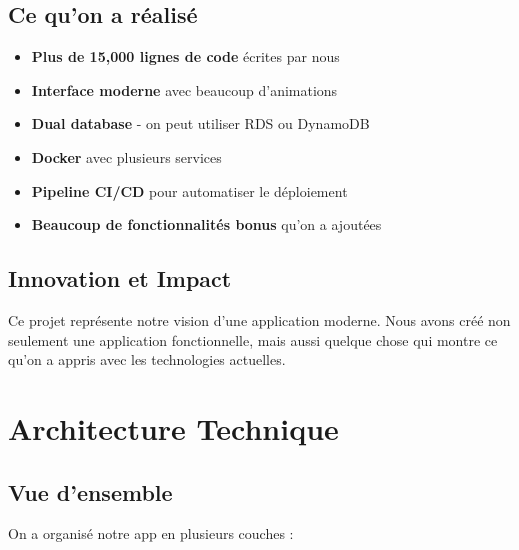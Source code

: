 \documentclass[12pt,a4paper]{report}
\begin{document}
\section{Ce qu'on a réalisé}

\begin{itemize}[label=\textcolor{primary}{$\checkmark$}]
    \item \textbf{Plus de 15,000 lignes de code} écrites par nous
    \item \textbf{Interface moderne} avec beaucoup d'animations
    \item \textbf{Dual database} - on peut utiliser RDS ou DynamoDB
    \item \textbf{Docker} avec plusieurs services
    \item \textbf{Pipeline CI/CD} pour automatiser le déploiement
    \item \textbf{Beaucoup de fonctionnalités bonus} qu'on a ajoutées
\end{itemize}

\section{Innovation et Impact}

Ce projet représente notre vision d'une application moderne. Nous avons créé non seulement une application fonctionnelle, mais aussi quelque chose qui montre ce qu'on a appris avec les technologies actuelles.

\chapter{Architecture Technique}

\section{Vue d'ensemble}

On a organisé notre app en plusieurs couches :
\end{document}
